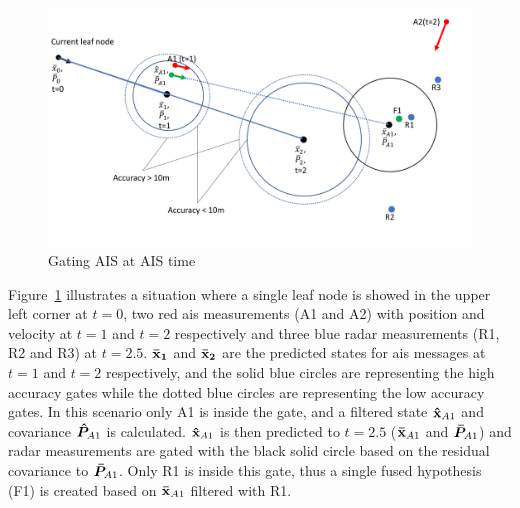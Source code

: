 \begin{figure}[H]
\centering
\includegraphics[width = .8\textwidth]{Figures/gating_at_ais_time.pdf}
\caption{Gating AIS at AIS time}\label{fig:gating_ais_at_ais_time}
\end{figure}
Figure~\ref{fig:gating_ais_at_ais_time} illustrates a situation where a single leaf node is showed in the upper left corner at \(t=0\), two red \gls{ais} measurements (A1 and A2) with position and velocity at \(t=1\) and \(t=2\) respectively and three blue radar measurements (R1, R2 and R3) at \(t=2.5\). \(\boldsymbol{\mathbf{\bar{x}_1}}\) and \(\boldsymbol{\mathbf{\bar{x}_2}}\) are the predicted states for \gls{ais} messages at \(t=1\) and \(t=2\) respectively, and the solid blue circles are representing the high accuracy gates while the dotted blue circles are representing the low accuracy gates. In this scenario only A1 is inside the gate, and a filtered state \(\boldsymbol{\mathbf{\hat{x}}}_{A1}\) and covariance \(\bm{\hat{P}}_{A1}\) is calculated. \(\boldsymbol{\mathbf{\hat{x}}}_{A1}\) is then predicted to \(t=2.5\) (\(\boldsymbol{\mathbf{\bar{x}}}_{A1}\) and \(\bm{\bar{P}}_{A1}\)) and radar measurements are gated with the black solid circle based on the residual covariance to \(\bm{\bar{P}}_{A1}\). Only R1 is inside this gate, thus a single fused hypothesis (F1) is created based on \(\boldsymbol{\mathbf{\bar{x}}}_{A1}\) filtered with R1.

